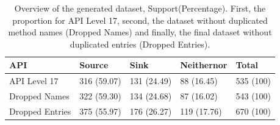 \begin{table}[h!]
    \centering
    \renewcommand{\arraystretch}{1.8}
    \begin{tabular}{ |p{3cm}|p{2.5cm}p{2.5cm}p{2.5cm}p{2cm}| }
        \hline
        API & Source & Sink & Neithernor & Total\\
        \hline
        API Level 17 & 316 (59.07) & 131 (24.49) & 88 (16.45) & 535 (100)\\
        Dropped Names & 322 (59.30) & 134 (24.68) & 87 (16.02) & 543 (100)\\
        Dropped Entries & 375 (55.97) & 176 (26.27) & 119 (17.76) & 670 (100)\\ [1ex]
        \hline
        \end{tabular}
        \caption{%
        Overview of the generated dataset, Support(Percentage). First, the proportion for API Level 17, second, the dataset without duplicated method names (Dropped Names) and finally, the final dataset without duplicated entries (Dropped Entries).%
        }\label{dset_prop}
\end{table}



